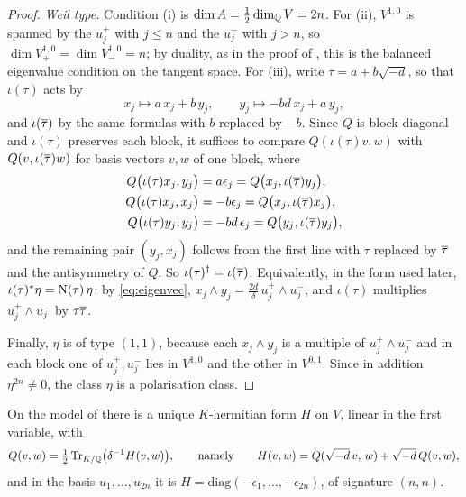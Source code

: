 \begin{proof}
\emph{Weil type.} Condition (i) is $\dim A=\tfrac12\dim_{\mathbb{Q}}V=2n$. For (ii),
$V^{1,0}$ is spanned by the $u_{j}^{+}$ with $j\le n$ and the $u_{j}^{-}$ with
$j>n$, so $\dim V^{1,0}_{+}=\dim V^{1,0}_{-}=n$; by duality, as in the proof
of , this is the balanced eigenvalue condition on the
tangent space. For (iii), write $\tau=a+b\sqrt{-d}$, so that $\iota(\tau)$
acts by
\[
  x_{j}\longmapsto a\,x_{j}+b\,y_{j},
  \qquad
  y_{j}\longmapsto -bd\,x_{j}+a\,y_{j},
\]
and $\iota(\overline{\tau})$ by the same formulas with $b$ replaced by $-b$. Since
$Q$ is block diagonal and $\iota(\tau)$ preserves each block, it suffices to
compare $Q(\iota(\tau)v,w)$ with $Q(v,\iota(\overline{\tau})w)$ for basis vectors
$v,w$ of one block, where
\begin{align*}
  Q\bigl(\iota(\tau)x_{j},y_{j}\bigr)&=a\epsilon_{j}
   =Q\bigl(x_{j},\iota(\overline{\tau})y_{j}\bigr),\\
  Q\bigl(\iota(\tau)x_{j},x_{j}\bigr)&=-b\epsilon_{j}
   =Q\bigl(x_{j},\iota(\overline{\tau})x_{j}\bigr),\\
  Q\bigl(\iota(\tau)y_{j},y_{j}\bigr)&=-bd\,\epsilon_{j}
   =Q\bigl(y_{j},\iota(\overline{\tau})y_{j}\bigr),
\end{align*}
and the remaining pair $(y_{j},x_{j})$ follows from the first line with
$\tau$ replaced by $\overline{\tau}$ and the antisymmetry of $Q$. So
$\iota(\tau)^{\dagger}=\iota(\overline{\tau})$. Equivalently, in the form used
later, $\iota(\tau)^{*}\eta=\mathrm{N}(\tau)\,\eta$: by \eqref{eq:eigenvec},
$x_{j}\wedge y_{j}=\tfrac{2d}{\delta}\,u_{j}^{+}\wedge u_{j}^{-}$, and
$\iota(\tau)$ multiplies $u_{j}^{+}\wedge u_{j}^{-}$ by $\tau\overline{\tau}$.

Finally, $\eta$ is of type $(1,1)$, because each $x_{j}\wedge y_{j}$ is a
multiple of $u_{j}^{+}\wedge u_{j}^{-}$ and in each block one of
$u_{j}^{+},u_{j}^{-}$ lies in $V^{1,0}$ and the other in $V^{0,1}$. Since in
addition $\eta^{2n}\ne0$, the class $\eta$ is a polarisation class.
\end{proof}

\begin{lemma}\label{lem:hermform}
On the model of  there is a unique $K$-hermitian form $H$ on
$V$, linear in the first variable, with
\begin{equation}\label{eq:QfromH}
  Q(v,w)=\tfrac12\operatorname{Tr}_{K/\mathbb{Q}}\bigl(\delta^{-1}H(v,w)\bigr),
  \qquad\text{namely}\qquad
  H(v,w)=Q(\sqrt{-d}\,v,\,w)+\sqrt{-d}\,Q(v,w),
\end{equation}
and in the basis $u_{1},\dots,u_{2n}$ it is
$H=\mathrm{diag}(-\epsilon_{1},\dots,-\epsilon_{2n})$, of signature $(n,n)$.
\end{lemma}

